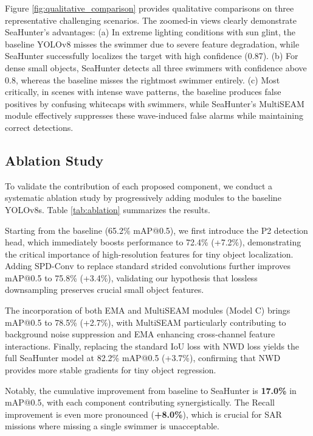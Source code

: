 Figure \ref{fig:qualitative_comparison} provides qualitative comparisons on three representative challenging scenarios. The zoomed-in views clearly demonstrate SeaHunter's advantages: (a) In extreme lighting conditions with sun glint, the baseline YOLOv8 misses the swimmer due to severe feature degradation, while SeaHunter successfully localizes the target with high confidence (0.87). (b) For dense small objects, SeaHunter detects all three swimmers with confidence above 0.8, whereas the baseline misses the rightmost swimmer entirely. (c) Most critically, in scenes with intense wave patterns, the baseline produces false positives by confusing whitecaps with swimmers, while SeaHunter's MultiSEAM module effectively suppresses these wave-induced false alarms while maintaining correct detections.


\subsection{Ablation Study}

To validate the contribution of each proposed component, we conduct a systematic ablation study by progressively adding modules to the baseline YOLOv8s. Table \ref{tab:ablation} summarizes the results.

Starting from the baseline (65.2\% mAP@0.5), we first introduce the P2 detection head, which immediately boosts performance to 72.4\% (+7.2\%), demonstrating the critical importance of high-resolution features for tiny object localization. Adding SPD-Conv to replace standard strided convolutions further improves mAP@0.5 to 75.8\% (+3.4\%), validating our hypothesis that lossless downsampling preserves crucial small object features.

The incorporation of both EMA and MultiSEAM modules (Model C) brings mAP@0.5 to 78.5\% (+2.7\%), with MultiSEAM particularly contributing to background noise suppression and EMA enhancing cross-channel feature interactions. Finally, replacing the standard IoU loss with NWD loss yields the full SeaHunter model at 82.2\% mAP@0.5 (+3.7\%), confirming that NWD provides more stable gradients for tiny object regression.

Notably, the cumulative improvement from baseline to SeaHunter is \textbf{17.0\%} in mAP@0.5, with each component contributing synergistically. The Recall improvement is even more pronounced (\textbf{+8.0\%}), which is crucial for SAR missions where missing a single swimmer is unacceptable.

